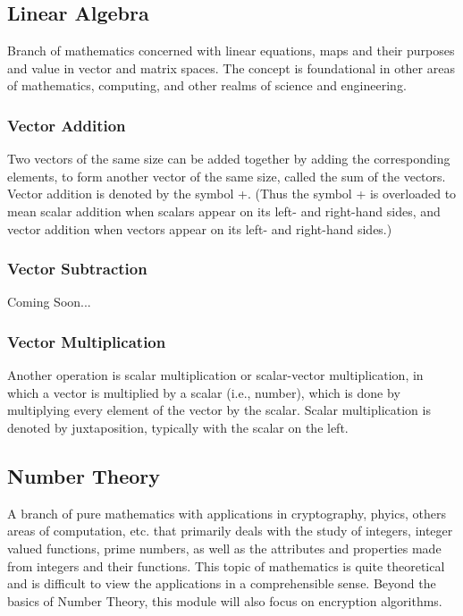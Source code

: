 \documentclass[12pt, letterpaper]{article}
\begin{document}
\begin{sloppypar}
\begin{flushleft}
\subsection{Linear Algebra}
Branch of mathematics concerned with linear equations, maps and their purposes and value 
in vector and matrix spaces. The concept is foundational in other areas of mathematics, 
computing, and other realms of science and engineering. 

\subsubsection{Vector Addition}
Two vectors of the same size can be added together by adding the corresponding elements, to 
form another vector of the same size, called the sum of the vectors. Vector addition is 
denoted by the symbol +. (Thus the symbol + is overloaded to mean scalar addition when 
scalars appear on its left- and right-hand sides, and vector addition when vectors appear 
on its left- and right-hand sides.)

\subsubsection{Vector Subtraction}
Coming Soon...

\subsubsection{Vector Multiplication}
Another operation is scalar multiplication or scalar-vector multiplication, in which a vector 
is multiplied by a scalar (i.e., number), which is done by multiplying every element of the 
vector by the scalar. Scalar multiplication is denoted by juxtaposition, typically with the 
scalar on the left.

\subsection{Number Theory}
A branch of pure mathematics with applications in cryptography, phyics, others areas of 
computation, etc. that primarily deals with the study of integers, integer valued functions, 
prime numbers, as well as the attributes and properties made from integers and their functions. 
This topic of mathematics is quite theoretical and is difficult to view the applications in a 
comprehensible sense. Beyond the basics of Number Theory, this module will also focus on 
encryption algorithms.


\end{flushleft}
\end{sloppypar}
\end{document}
